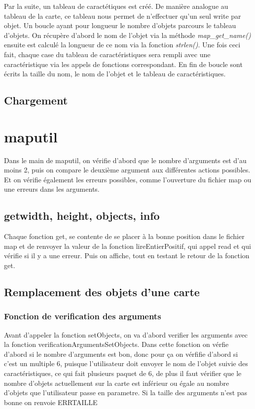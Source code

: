 \documentclass[10pt,a4paper]{article}
\begin{document}
	Par la suite, un tableau de caractétiques est créé. De manière analogue au tableau de la carte, ce tableau nous permet de n'effectuer qu'un seul write par objet. Un boucle ayant pour longueur le nombre d'objets parcours le tableau d'objets. On récupère d'abord le nom de l'objet via la méthode \textit{map\_get\_name()} ensuite est calculé la longueur de ce nom via la fonction \textit{strlen()}. Une fois ceci fait, chaque case du tableau de caractéristiques sera rempli avec une caractéristique via les appels de fonctions correspondant. En fin de boucle sont écrits la taille du nom, le nom de l'objet et le tableau de caractéristiques.
	
\subsection{Chargement}

\section{maputil}
    Dans le main de maputil, on vérifie d'abord que le nombre d'arguments est d'au moins 2, puis on compare le deuxième argument aux différentes actions possibles. Et on vérifie également les erreurs possibles, comme l'ouverture du fichier map ou une erreurs dans les arguments.
\subsection{getwidth, height, objects, info}
    Chaque fonction get, se contente de se placer à la bonne position dans le fichier map et de renvoyer la valeur de la fonction lireEntierPositif, qui appel read et qui vérifie si il y a une erreur. Puis on affiche, tout en testant le retour de la fonction get. 
\subsection{Remplacement des objets d'une carte}
        \subsubsection{Fonction de verification des arguments}
            Avant d'appeler la fonction setObjects, on va d'abord verifier les arguments avec la fonction verificationArgumentsSetObjects.
            Dans cette fonction on vérfie d'abord si le nombre d'arguments est bon, donc pour ça on vérfifie d'abord si c'est un multiple 6, puisque l'utilisateur doit envoyer le nom de l'objet suivie des caractéristiques, ce qui fait plusieurs paquet de 6, de plus il faut vérifier que le nombre d'objets actuellement sur la carte est inférieur ou égale au nombre d'objets que l'utilisateur passe en parametre. Si la taille des arguments n'est pas bonne on renvoie ERRTAILLE
            
\end{document}
